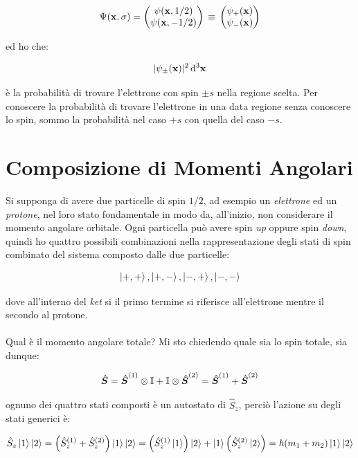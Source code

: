\begin{align*}
	\Psi(\vb{x}, \sigma) = \mqty( \psi\qty(\vb{x}, 1/2) \\  \psi\qty(\vb{x}, -1/2) ) \, \equiv \, \mqty( \psi_+\qty(\vb{x}) \\\psi_-\qty(\vb{x}) )
\end{align*}

	ed ho che:
	
\begin{align*}
	| \psi_{\pm} (\vb{x}) |^2 \, \dd^3 \vb{x}
\end{align*}

	è la probabilità di trovare l'elettrone con spin $\pm s$ nella regione scelta. Per conoscere la probabilità di trovare l'elettrone in una data regione senza conoscere lo spin, sommo la probabilità nel caso $+s$ con quella del caso $-s$.

\section{Composizione di Momenti Angolari}

	Si supponga di avere due particelle di spin $1/2$, ad esempio un \textit{elettrone} ed un \textit{protone}, nel loro stato fondamentale in modo da, all'inizio, non considerare il momento angolare orbitale. Ogni particella può avere spin \textit{up} oppure spin \textit{down}, quindi ho quattro possibili combinazioni nella rappresentazione degli stati di spin combinato del sistema composto dalle due particelle:
	
\begin{align*}
	\ket{+, +}, \ket{+, -}, \ket{-, +}, \ket{-, -}
\end{align*}

	dove all'interno del \textit{ket} si  il primo termine si riferisce all'elettrone mentre il secondo al protone.
	\\
	\\
	Qual è il momento angolare totale? Mi sto chiedendo quale sia lo spin totale, sia dunque:

\begin{align*}
	\vb*{\hat{S}} = \vb*{\hat{S}}^{\qty(1)} \otimes \mathbb{I} + \mathbb{I} \otimes \vb*{\hat{S}}^{\qty(2)} = \vb*{\hat{S}}^{\qty(1)} + \vb*{\hat{S}}^{\qty(2)}
\end{align*}

	ognuno dei quattro stati composti è un autostato di $\hat{S}_z$, perciò l'azione su degli stati generici è:
	
\begin{align*}
	\hat{S}_z \ket{1} \ket{2} = \qty(\hat{S}_z^{\qty(1)} + \hat{S}_z^{\qty(2)}  ) \ket{1} \ket{2} = \qty(\hat{S}_z^{\qty(1)} \ket{1}) \ket{2} + \ket{1} \qty(\hat{S}_z^{\qty(2)} \ket{2}) = \hbar \qty(m_1 + m_2) \ket{1} \ket{2}
\end{align*}

